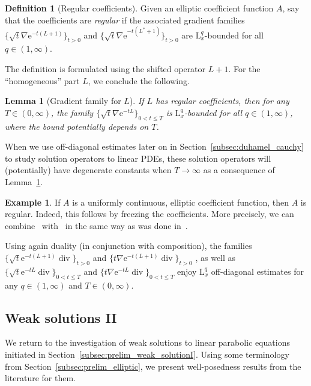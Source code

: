\documentclass[11pt, leqno]{amsart}
\newtheorem{lemma}[theorem]{Lemma}
\theoremstyle{definition}
\newtheorem{definition}[theorem]{Definition}
\newtheorem{example}[theorem]{Example}
\renewcommand{\L}{\mathrm{L}}
\newcommand{\e}{\mathrm{e}}
\DeclareMathOperator{\Div}{div}
\begin{document}
	\begin{definition}[Regular coefficients]
		\label{def:regular_A}
		Given an elliptic coefficient function $A$, say that the coefficients are \emph{regular} if the associated gradient families $\{ \sqrt{t} \nabla \e^{-t(L+1)} \}_{t>0}$ and $\{ \sqrt{t} \nabla \e^{-t(L^*+1)} \}_{t>0}$ are $\L^q_x$-bounded for all $q\in (1,\infty)$.
	\end{definition}

	The definition is formulated using the shifted operator $L+1$. For the \enquote{homogeneous} part $L$, we conclude the following.

	\begin{lemma}[Gradient family for $L$]
		\label{lem:regular_coefficients}
		If $L$ has regular coefficients, then for any $T \in (0,\infty)$, the family $\{ \sqrt{t} \nabla \e^{-tL} \}_{0<t \leq T}$ is $\L^q_x$-bounded for all $q\in (1,\infty)$, where the bound potentially depends on $T$.
	\end{lemma}

	When we use off-diagonal estimates later on in Section~\ref{subsec:duhamel_cauchy} to study solution operators to linear PDEs, these solution operators will (potentially) have degenerate constants when $T \to \infty$ as a consequence of Lemma~\ref{lem:regular_coefficients}.

	\begin{example}
		\label{ex:regular_A}
		If $A$ is a uniformly continuous, elliptic coefficient function, then $A$ is regular. Indeed, this follows by freezing the coefficients. More precisely, we can combine~\cite{Dong-Kim-TAMS} with~\cite[Thm.~12.13]{Block} in the same way as was done in~\cite[Sec.~3]{B_Lions}.
	\end{example}

	Using again duality (in conjunction with composition), the families $\{ \sqrt{t} \e^{-t(L+1)} \Div \}_{t>0}$ and $\{ t \nabla \e^{-t(L+1)} \Div \}_{t>0}$ , as well as $\{ \sqrt{t} \e^{-tL} \Div \}_{0<t \leq T}$ and $\{ t \nabla\e^{-tL} \Div \}_{0<t \leq T}$ enjoy $\L^q_x$ off-diagonal estimates for any $q\in (1, \infty)$ and $T \in (0,\infty)$.

	\subsection{Weak solutions II}
	\label{subsec:prelim_weak_solutionII}

	We return to the investigation of weak solutions to linear parabolic equations initiated in Section~\ref{subsec:prelim_weak_solutionI}. Using some terminology from Section~\ref{subsec:prelim_elliptic}, we present well-posedness results from the literature for them.
\end{document}
